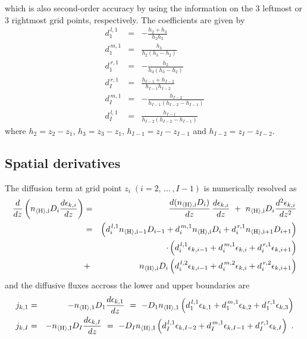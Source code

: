 \documentclass[11pt]{article}
\def\nHi{n_{\langle\rm H\rangle,i}}
\def\nHleft{n_{\langle\rm H\rangle,1}}
\def\nHright{n_{\langle\rm H\rangle,I}}
\def\nHim1{n_{\langle\rm H\rangle,i-1}}
\def\nHip1{n_{\langle\rm H\rangle,i+1}}
\begin{document}
which is also second-order accuracy by using the information on the 
3 leftmost or 3 rightmost grid points, respectively.
The coefficients are given by
\begin{eqnarray}
      d^{\,l,1}_1 &=& -\frac{h_2+h_3}{h_2 h_3} \\
      d^{\,m,1}_1 &=&  \frac{h_3}{h_2(h_3-h_2)} \\
      d^{\,r,1}_1 &=& -\frac{h_2}{h_3(h_3-h_2)} \\
      d^{\,r,1}_I &=&  \frac{h_{I-1}+h_{I-2}}{h_{I-1} h_{I-2}} \\
      d^{\,m,1}_I &=& -\frac{h_{I-2}}{h_{I-1}(h_{I-2}-h_{I-1})} \\
      d^{\,l,1}_I &=&  \frac{h_{I-1}}{h_{I-2}(h_{I-2}-h_{I-1})}
\end{eqnarray}
where $h_2=z_2-z_1$, $h_3=z_3-z_1$, $h_{I-1}=z_I-z_{I-1}$ and 
$h_{I-2}=z_I-z_{I-2}$.

\subsection{Spatial derivatives}

The diffusion term at grid point $z_i\;(i=2,\,...\,,I-1)$ 
is numerically resolved as
\begin{eqnarray}
  \frac{d}{dz}\left(\nHi D_i\frac{d\epsilon_{k,i}}{dz}\right) 
  &=&  \frac{d(\nHi D_i)}{dz}\,\frac{d\epsilon_{k,i}}{dz}
       ~+~\nHi D_i\frac{d^2\epsilon_{k,i}}{dz^2} \nonumber\\
  &=& \left(d^{\,l,1}_i\nHim1 D_{i-1} 
          + d^{\,m,1}_i\nHi   D_i 
          + d^{\,r,1}_i\nHip1 D_{i+1}\right)\nonumber\\
  &&
   \!\!\!\cdot \left(d^{\,l,1}_i\epsilon_{k,i-1} 
                   + d^{\,m,1}_i\epsilon_{k,i} 
                   + d^{\,r,1}_i\epsilon_{k,i+1} \right) \nonumber\\
  &+& \nHi D_i \left(d^{\,l,2}_i\epsilon_{k,i-1} 
                   + d^{\,m,2}_i\epsilon_{k,i} 
                   + d^{\,r,2}_i\epsilon_{k,i+1} \right) \label{Acoeff}
\end{eqnarray}
and the diffusive fluxes accross the lower and upper boundaries are
\begin{eqnarray}
 j_{k,1} &=& -\nHleft D_1 \frac{d\epsilon_{k,1}}{dz}
        ~=~ -D_1\nHleft \left(d^{\,l,1}_1\epsilon_{k,1} 
                            + d^{\,m,1}_1\epsilon_{k,2} 
                            + d^{\,r,1}_1\epsilon_{k,3}\right)\\
 j_{k,I} &=& -\nHright D_I \frac{d\epsilon_{k,I}}{dz}
        ~=~ -D_I\nHright \left(d^{\,l,1}_I\epsilon_{k,I-2} 
                            + d^{\,m,1}_I\epsilon_{k,I-1} 
                            + d^{\,r,1}_I\epsilon_{k,I}\right) \ .
\end{eqnarray}
\end{document}
